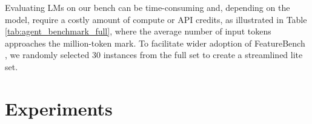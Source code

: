 \documentclass{article}
\newcommand{\myparagraph}[1]{\noindent{\bf #1}}
\def\name{FeatureBench }
\begin{document}
\myparagraph{Lite Set.} Evaluating LMs on our bench can be time-consuming and, depending on the model, require a costly amount of compute or API credits, as illustrated in Table \ref{tab:agent_benchmark_full}, where the average number of input tokens approaches the million-token mark. To facilitate wider adoption of \name, we randomly selected 30 instances from the full set to create a streamlined lite set.
\begin{table}[t]
  \centering
  \caption{The performance of various frontier large models combined with advanced agentic frameworks on the Lite and Full evaluation sets of our benchmark. Models marked with $^{\dagger}$ use low reasoning, and $^{\ddagger}$ use medium reasoning.}
  \label{tab:agent_benchmark_full}
\end{table}

\section{Experiments}
\label{experiments}
\end{document}
